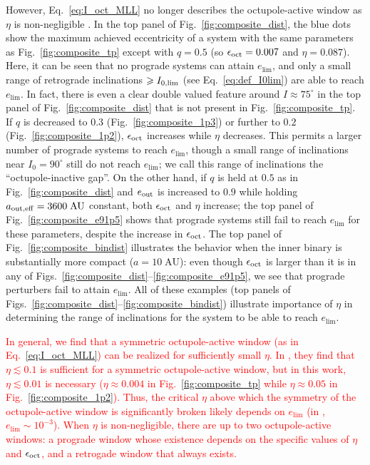 \documentclass[
        fleqn,
        usenatbib,
    ]{mnras}
\begin{document}
However, Eq.~\eqref{eq:I_oct_MLL} no longer describes the octupole-active window
as $\eta$ is non-negligible \citep[see also][]{rodet_inprep}. In the top panel
of Fig.~\ref{fig:composite_dist}, the blue dots show the maximum achieved
eccentricity of a system with the same parameters as Fig.~\ref{fig:composite_tp}
except with $q = 0.5$ (so $\epsilon_{\rm oct} = 0.007$ and $\eta = 0.087$).
Here, it can be seen that no prograde systems can attain $e_{\lim}$, and only a
small range of retrograde inclinations $\geq I_{\rm 0, \lim}$ (see
Eq.~\ref{eq:def_I0lim}) are able to reach $e_{\lim}$. In fact, there is even a
clear double valued feature around $I \approx 75^\circ$ in the top panel of
Fig.~\ref{fig:composite_dist} that is not present in
Fig.~\ref{fig:composite_tp}. If $q$ is decreased to $0.3$
(Fig.~\ref{fig:composite_1p3}) or further to $0.2$
(Fig.~\ref{fig:composite_1p2}), $\epsilon_{\rm oct}$ increases while $\eta$
decreases. This permits a larger number of prograde systems to reach $e_{\lim}$,
though a small range of inclinations near $I_0 = 90^\circ$ still do not reach
$e_{\lim}$; we call this range of inclinations the ``octupole-inactive gap''. On
the other hand, if $q$ is held at $0.5$ as in Fig.~\ref{fig:composite_dist} and
$e_{\rm out}$ is increased to $0.9$ while holding $a_{\rm out, eff} =
3600\;\mathrm{AU}$ constant, both $\epsilon_{\rm oct}$ and $\eta$ increase; the
top panel of Fig.~\ref{fig:composite_e91p5} shows that prograde systems still
fail to reach $e_{\lim}$ for these parameters, despite the increase in
$\epsilon_{\rm oct}$. The top panel of Fig.~\ref{fig:composite_bindist}
illustrates the behavior when the inner binary is substantially more compact ($a
= 10\;\mathrm{AU}$): even though $\epsilon_{\rm oct}$ is larger than it is
in any of Figs.~\ref{fig:composite_dist}--\ref{fig:composite_e91p5}, we
see that prograde perturbers fail to attain $e_{\lim}$. All of these examples
(top panels of Figs.~\ref{fig:composite_dist}--\ref{fig:composite_bindist})
illustrate importance of $\eta$ in determining the range of inclinations for the
system to be able to reach $e_{\lim}$.

\textcolor{red}{In general, we find that a symmetric octupole-active window (as
in Eq.~\ref{eq:I_oct_MLL}) can be realized for sufficiently small $\eta$. In
\citet{rodet_inprep}, they find that $\eta \lesssim 0.1$ is sufficient for a
symmetric octupole-active window, but in this work, $\eta \lesssim 0.01$ is
necessary ($\eta \approx 0.004$ in Fig.~\ref{fig:composite_tp} while $\eta
\approx 0.05$ in Fig.~\ref{fig:composite_1p2}). Thus, the critical $\eta$ above
which the symmetry of the octupole-active window is significantly broken likely
depends on $e_{\lim}$ (in \citet{rodet_inprep}, $e_{\lim} \sim 10^{-3}$). When
$\eta$ is non-negligible, there are up to two octupole-active windows: a
prograde window whose existence depends on the specific values of $\eta$ and
$\epsilon_{\rm oct}$, and a retrogade window that always exists.}
\end{document}
